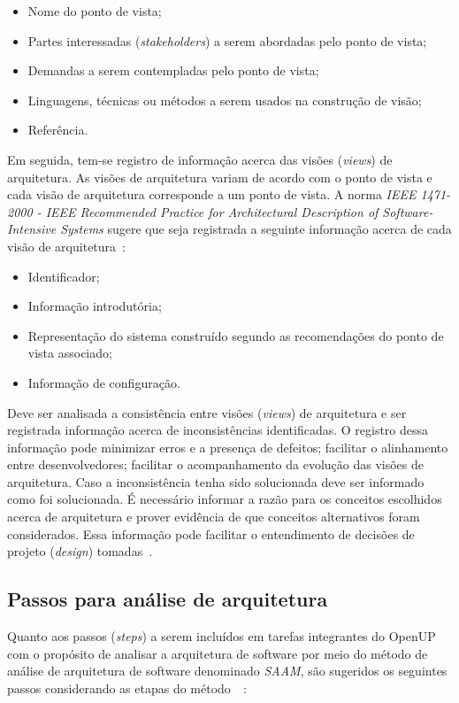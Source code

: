 \begin{itemize}
    \item Nome do ponto de vista;
    \item Partes interessadas (\emph{stakeholders}) a serem abordadas pelo ponto de vista;
    \item Demandas a serem contempladas pelo ponto de vista;
    \item Linguagens, técnicas ou métodos a serem usados na construção de visão;
    \item Referência.

\end{itemize}

Em seguida, tem-se registro de informação acerca das visões (\emph{views}) de arquitetura. As visões de arquitetura variam de acordo com o ponto de vista e cada visão de arquitetura corresponde a um ponto de vista. A norma \emph{ IEEE 1471-2000 - IEEE Recommended Practice for Architectural Description of Software-Intensive Systems} sugere que seja registrada a seguinte informação acerca de cada visão de arquitetura~\cite{ISO_1471}: 

\begin{itemize}
    \item Identificador;
    \item Informação introdutória;
    \item Representação do sistema construído segundo as recomendações do ponto de vista associado;
    \item Informação de configuração.

\end{itemize}

Deve ser analisada a consistência entre visões (\emph{views}) de arquitetura e ser registrada informação acerca de inconsistências identificadas. O registro dessa informação pode minimizar erros e a presença de defeitos; facilitar o alinhamento entre desenvolvedores; facilitar o acompanhamento da evolução das visões de arquitetura. Caso a inconsistência tenha sido solucionada deve ser informado como foi solucionada. É necessário informar a razão para os conceitos escolhidos acerca de arquitetura e prover evidência de que conceitos alternativos foram considerados. Essa informação pode facilitar o entendimento de decisões de projeto (\emph{design}) tomadas~\cite{ISO_1471}.

\subsection{Passos para análise de arquitetura}
\label{sec:5.2.2}
Quanto aos passos (\emph{steps}) a serem incluídos em tarefas integrantes do OpenUP com o propósito de analisar a arquitetura de software por meio do método de análise de arquitetura de software denominado \emph{\acrfull{SAAM}}, são sugeridos os seguintes passos considerando as etapas do método~\cite{survey_methods}~\cite{scenario_methods}:

